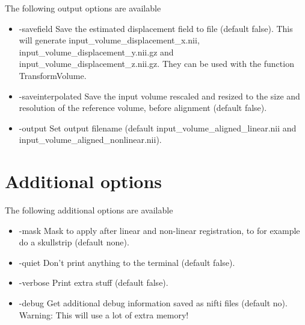 The following output options are available

\begin{itemize}

\item -savefield                 
\newline \newline Save the estimated displacement field to file (default false). This will generate input\_volume\_displacement\_x.nii, input\_volume\_displacement\_y.nii.gz and input\_volume\_displacement\_z.nii.gz. They can be used with the function TransformVolume.

\item -saveinterpolated          
\newline \newline Save the input volume rescaled and resized to the size and resolution of the reference volume, before alignment (default false). 

\item -output 
\newline \newline Set output filename (default input\_volume\_aligned\_linear.nii and input\_volume\_aligned\_nonlinear.nii). 

\end{itemize}

\section{Additional options}

The following additional options are available

\begin{itemize}

\item -mask                      
\newline \newline Mask to apply after linear and non-linear registration, to for example do a skullstrip (default none). 

\item -quiet 
\newline \newline Don't print anything to the terminal (default false). 

\item -verbose
\newline \newline Print extra stuff (default false).
 
\item -debug 
\newline \newline Get additional debug information saved as nifti files (default no). Warning: This will use a lot of extra memory! 

\end{itemize}


